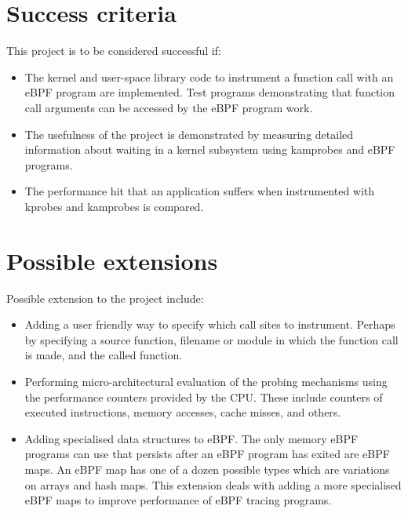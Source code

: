 \section*{Success criteria}

    This project is to be considered successful if:
    \begin{itemize}
        \item The kernel and user-space library code to instrument a function call with an eBPF program are implemented.
        Test programs demonstrating that function call arguments can be accessed by the eBPF program work.

        \item The usefulness of the project is demonstrated by measuring detailed information about waiting in 
        a kernel subsystem using kamprobes and eBPF programs.

        \item The performance hit that an application suffers when instrumented with kprobes and kamprobes is 
        compared.

    \end{itemize}

\section*{Possible extensions}

    Possible extension to the project include:
    \begin{itemize}
        \item Adding a user friendly way to specify which call sites to instrument. Perhaps by specifying a
        source function, filename or module in which the function call is made, and the called function.

        \item Performing micro-architectural evaluation of the probing mechanisms using the performance counters
        provided by the CPU. These include counters of executed instructions, memory accesses, cache misses, and others.
        
        \item Adding specialised data structures to eBPF. The only memory eBPF programs can use that persists after an
        eBPF program has exited are eBPF maps. An eBPF map has one of a dozen possible types which are variations
        on arrays and hash maps. This extension deals with adding a more specialised eBPF maps to improve performance
        of eBPF tracing programs.
    \end{itemize}

